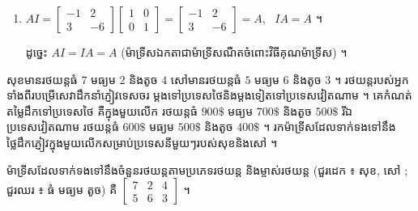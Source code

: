 \begin{enumerate}[a]
  $AC + BC = \begin{bmatrix} 1 & 10 & -13\\ -3 & -30 & 39 \end{bmatrix} + \begin{bmatrix} 8 & 0 & -4\\ 5 & 34 & -45 \end{bmatrix} = \begin{bmatrix} 9 & 10 & -17\\ 2 & 4 & -6 \end{bmatrix}$ ។

  ដូច្នេះ $(A + B)C = AC + BC$ (វិធីគុណម៉ាទ្រីសមានលក្ខណៈបំបែកចំពោះវិធីបូក) ។
  \item $AI = \begin{bmatrix} -1 & 2\\ 3 & -6 \end{bmatrix}\begin{bmatrix} 1 & 0\\ 0 & 1 \end{bmatrix} = \begin{bmatrix} -1 & 2\\ 3 & -6 \end{bmatrix} = A$, \ $IA = A$ ។

  ដូច្នេះ $AI = IA = A$ (ម៉ាទ្រីសឯកតាជាម៉ាទ្រីសណឺតចំពោះវិធីគុណម៉ាទ្រីស) ។
\end{enumerate}

\begin{example}[លំហាត់គំរូ ៧]
សុខមានរថយន្តធំ $7$ មធ្យម $2$ និងតូច $4$ សៅមានរថយន្តធំ $5$ មធ្យម $6$ និងតូច $3$ ។ រថយន្តរបស់អ្នកទាំងពីរបម្រើសេវាដឹកនាំភ្ញៀវទេសចរ ម្តងទៅប្រទេសថៃនិងម្តងទៀតទៅប្រទេសវៀតណាម ។ គេកំណត់តម្លៃដឹកទៅប្រទេសថៃ គឺក្នុងមួយលើក រថយន្តធំ $900\$$ មធ្យម $700\$$ និងតូច $500\$$ រីឯប្រទេសវៀតណាម រថយន្តធំ $600\$$ មធ្យម $500\$$ និងតូច $400\$$ ។ រកម៉ាទ្រីសដែលទាក់ទងទៅនឹងថ្លៃដឹកភ្ញៀវក្នុងមួយលើកសម្រាប់ប្រទេសនីមួយៗរបស់សុខនិងសៅ ។
\end{example}
\ans
ម៉ាទ្រីសដែលទាក់ទងទៅនឹងចំនួនរថយន្តតាមប្រភេទរថយន្ត និងម្ចាស់រថយន្ត (ជួរដេក ៖ សុខ, សៅ ; ជួរឈរ ៖ ធំ មធ្យម តូច) គឺ $\begin{bmatrix} 7 & 2 & 4\\ 5 & 6 & 3 \end{bmatrix}$ ។

